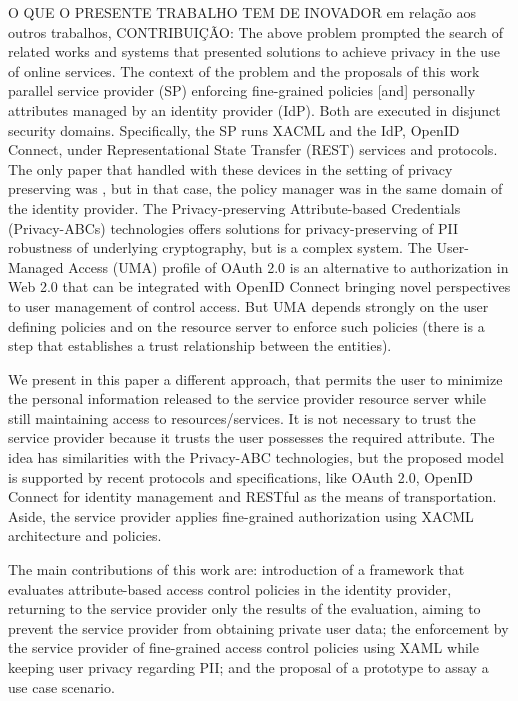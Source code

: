 \documentclass{doublecol-new}
\begin{document}
O QUE O PRESENTE TRABALHO TEM DE INOVADOR em relação aos outros trabalhos, CONTRIBUIÇÃO:
The above problem prompted the search of related works and systems that presented solutions to achieve privacy in the use of online services. The context of the problem and the proposals of this work parallel service provider (SP) enforcing fine-grained policies [and] personally attributes managed by an identity provider (IdP). Both are executed in disjunct security domains. Specifically, the SP runs XACML and the IdP, OpenID Connect, under Representational State Transfer (REST) services and protocols. The only paper that handled with these devices in the setting of privacy preserving was \citep{ma2015cloud}, but in that case, the policy manager was in the same domain of the identity provider. The Privacy-preserving Attribute-based Credentials (Privacy-ABCs) technologies \cite{camenisch2009credential,dagdee2011extending} offers solutions for privacy-preserving of PII robustness of underlying cryptography, but is a complex system. The User-Managed Access (UMA) profile of OAuth 2.0 \cite{hardjono-oauth-umacore-14} is an alternative to authorization in Web 2.0 that can be integrated with OpenID Connect bringing novel perspectives to user management of control access. But UMA depends strongly on the user defining policies and on the resource server to enforce such policies (there is a step that establishes a trust relationship between the entities). 

We present in this paper a different approach, that permits the user to minimize the personal information released to the service provider resource server while still maintaining access to resources/services. It is not necessary to trust the service provider because it trusts the user possesses the required attribute. The idea has similarities with the Privacy-ABC technologies, but the proposed model is supported by recent protocols and specifications, like OAuth 2.0, OpenID Connect for identity management and RESTful as the means of transportation. Aside, the service provider applies fine-grained authorization using XACML architecture and policies.


The main contributions of this work are: introduction of a framework that evaluates attribute-based access control policies in the identity provider, returning to the service provider only the results of the evaluation, aiming to prevent the service provider from obtaining private user data; the enforcement by the service provider of fine-grained access control policies using XAML while keeping user privacy regarding PII; and the proposal of a prototype to assay a use case scenario.
\end{document}
